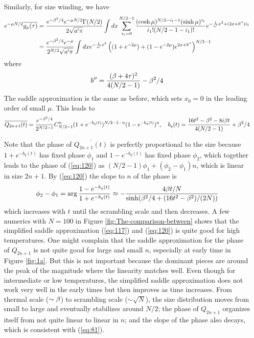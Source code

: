 \documentclass[11pt]{article}
\renewcommand{\>}{\rangle}
\newcommand{\<}{\langle}
\begin{document}
Similarly, for size winding, we have 
\begin{align}
e^{-\mu N/2}\overline{g_{\mu}(\tau)} & =\frac{e^{-\beta^{2}/4}e^{-\mu N/2}\Gamma(N/2)}{2\sqrt{a'\pi}}\int dx\sum_{i_{1}=0}^{N/2-1}\frac{(\cosh\mu)^{N/2-i_{1}-1}(\sinh\mu)^{i_{1}}}{i_{1}!(N/2-1-i_{1})!}e^{-\frac{1}{a'}x^{2}+(2x+b'')i_{1}}\nonumber \\
 & =\frac{e^{-\beta^{2}/4}e^{-\mu}}{2^{N/2}\sqrt{a'\pi}}\int dxe^{-\frac{1}{a'}x^{2}}\left((1+e^{-2\mu})+(1-e^{-2\mu})e^{2x+b''}\right)^{N/2-1}
\end{align}
where 
\begin{equation}
b''=\frac{(\beta+4\tau)^{2}}{4(N/2-1)}-\beta^{2}/4
\end{equation}
The saddle approximation is the same as before, which sets $x_{0}=0$
in the leading order of small $\mu$. This leads to
\begin{equation}
\overline{Q_{2n+1}(t)}=\frac{e^{-\beta^{2}/4}}{2^{N/2-1}}C_{N/2-1}^{n}(1+e^{-b_{q}(t)})^{N/2-1-n}(1-e^{-b_{q}(t)})^{n},\quad b_{q}(t)=\frac{16t^{2}-\beta^{2}-8i\beta t}{4(N/2-1)}+\beta^{2}/4\label{eq:120}
\end{equation}

Note that the phase of $\overline{Q_{2n+1}(t)}$ is perfectly proportional
to the size because $1+e^{-b_{q}(t)}$ has fixed phase $\phi_{1}$
and $1-e^{-b_{q}(t)}$ has fixed phase $\phi_{2}$, which together
leads to the phase of (\ref{eq:120}) as $(N/2-1)\phi_{1}+(\phi_{2}-\phi_{1})n$,
which is linear in size $2n+1$. By (\ref{eq:120}) the slope to $n$
of the phase is
\begin{equation}
\phi_{2}-\phi_{1}=\arg\frac{1-e^{-b_{q}(t)}}{1+e^{-b_{q}(t)}}\approx-\frac{4\beta t/N}{\sinh(\beta^{2}/4+(16t^{2}-\beta^{2})/(2N))}\label{eq:81}
\end{equation}
which increases with $t$ until the scrambling scale and then decreases.
A few numerics with $N=100$ in Figure \ref{fig:The-comparison-between}
shows that the simplified saddle approximation (\ref{eq:117}) and
(\ref{eq:120}) is quite good for high temperatures. One might complain
that the saddle approximation for the phase of $Q_{2n+1}$ is not
quite good for large and small $n$, especially at early time in Figure
\ref{fig:1a}. But this is not important because the dominant pieces
are around the peak of the magnitude where the linearity matches well.
Even though for intermediate or low temperatures, the simplified saddle
approximation does not work very well in the early times but then improves as time increases. From thermal scale ($\sim\beta$) to scrambling scale
($\sim\sqrt{N}$), the size distribution moves from small to large
and eventually stabilizes around $N/2$; the phase of $Q_{2n+1}$ organizes
itself from not quite linear to linear in $n$; and the slope of the
phase also decays, which is consistent with (\ref{eq:81}).
\end{document}
